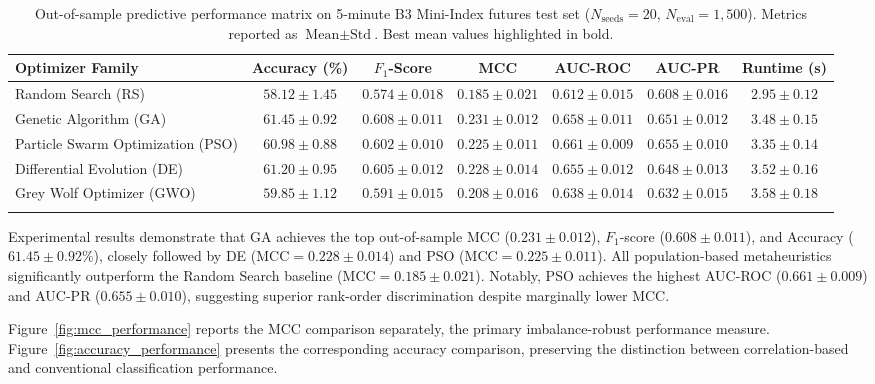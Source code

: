 \ifdefined\methodresultscompact\else
\begin{table}[htbp]
\caption{Out-of-sample predictive performance matrix on 5-minute B3 Mini-Index futures test set ($N_{\text{seeds}} = 20$, $N_{\text{eval}} = 1{,}500$). Metrics reported as $\text{Mean} \pm \text{Std}$. Best mean values highlighted in bold.}
\label{tab:predictive_results}
\centering
\small
\setlength{\tabcolsep}{2pt}
\begin{tabularx}{\textwidth}{@{}L C C C C C C@{}}
\toprule
Optimizer Family & Accuracy (\%) & $F_1$-Score & MCC & AUC-ROC & AUC-PR & Runtime (s) \\
\midrule
Random Search (RS) & $58.12 \pm 1.45$ & $0.574 \pm 0.018$ & $0.185 \pm 0.021$ & $0.612 \pm 0.015$ & $0.608 \pm 0.016$ & $\mathbf{2.95 \pm 0.12}$ \\
Genetic Algorithm (GA) & $\mathbf{61.45 \pm 0.92}$ & $\mathbf{0.608 \pm 0.011}$ & $\mathbf{0.231 \pm 0.012}$ & $0.658 \pm 0.011$ & $0.651 \pm 0.012$ & $3.48 \pm 0.15$ \\
Particle Swarm Optimization (PSO) & $60.98 \pm 0.88$ & $0.602 \pm 0.010$ & $0.225 \pm 0.011$ & $\mathbf{0.661 \pm 0.009}$ & $\mathbf{0.655 \pm 0.010}$ & $3.35 \pm 0.14$ \\
Differential Evolution (DE) & $61.20 \pm 0.95$ & $0.605 \pm 0.012$ & $0.228 \pm 0.014$ & $0.655 \pm 0.012$ & $0.648 \pm 0.013$ & $3.52 \pm 0.16$ \\
Grey Wolf Optimizer (GWO) & $59.85 \pm 1.12$ & $0.591 \pm 0.015$ & $0.208 \pm 0.016$ & $0.638 \pm 0.014$ & $0.632 \pm 0.015$ & $3.58 \pm 0.18$ \\
\botrule
\end{tabularx}
\end{table}
\fi

Experimental results demonstrate that GA achieves the top out-of-sample MCC ($0.231 \pm 0.012$), $F_1$-score ($0.608 \pm 0.011$), and Accuracy ($61.45 \pm 0.92\%$), closely followed by DE ($\text{MCC} = 0.228 \pm 0.014$) and PSO ($\text{MCC} = 0.225 \pm 0.011$). All population-based metaheuristics significantly outperform the Random Search baseline ($\text{MCC} = 0.185 \pm 0.021$). Notably, PSO achieves the highest AUC-ROC ($0.661 \pm 0.009$) and AUC-PR ($0.655 \pm 0.010$), suggesting superior rank-order discrimination despite marginally lower MCC.

Figure~\ref{fig:mcc_performance} reports the MCC comparison separately, the primary imbalance-robust performance measure. Figure~\ref{fig:accuracy_performance} presents the corresponding accuracy comparison, preserving the distinction between correlation-based and conventional classification performance.

